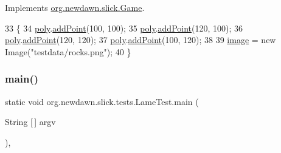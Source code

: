 Implements \mbox{\hyperlink{interfaceorg_1_1newdawn_1_1slick_1_1_game_ad2dd6affab08bb8fdb5fab0815957b7a}{org.\+newdawn.\+slick.\+Game}}.


\begin{DoxyCode}
33                                                                     \{
34         \mbox{\hyperlink{classorg_1_1newdawn_1_1slick_1_1tests_1_1_lame_test_a5d3e81e1db5ba7234621635d3665753d}{poly}}.\mbox{\hyperlink{classorg_1_1newdawn_1_1slick_1_1geom_1_1_polygon_a62d22ea48361fe38f8868f1f126a7b7a}{addPoint}}(100, 100);
35         \mbox{\hyperlink{classorg_1_1newdawn_1_1slick_1_1tests_1_1_lame_test_a5d3e81e1db5ba7234621635d3665753d}{poly}}.\mbox{\hyperlink{classorg_1_1newdawn_1_1slick_1_1geom_1_1_polygon_a62d22ea48361fe38f8868f1f126a7b7a}{addPoint}}(120, 100);
36         \mbox{\hyperlink{classorg_1_1newdawn_1_1slick_1_1tests_1_1_lame_test_a5d3e81e1db5ba7234621635d3665753d}{poly}}.\mbox{\hyperlink{classorg_1_1newdawn_1_1slick_1_1geom_1_1_polygon_a62d22ea48361fe38f8868f1f126a7b7a}{addPoint}}(120, 120);
37         \mbox{\hyperlink{classorg_1_1newdawn_1_1slick_1_1tests_1_1_lame_test_a5d3e81e1db5ba7234621635d3665753d}{poly}}.\mbox{\hyperlink{classorg_1_1newdawn_1_1slick_1_1geom_1_1_polygon_a62d22ea48361fe38f8868f1f126a7b7a}{addPoint}}(100, 120);
38     
39         \mbox{\hyperlink{classorg_1_1newdawn_1_1slick_1_1tests_1_1_lame_test_a00beddefcc3b233938def19fc8d969fb}{image}} = \textcolor{keyword}{new} Image(\textcolor{stringliteral}{"testdata/rocks.png"});
40     \}
\end{DoxyCode}
\mbox{\label{classorg_1_1newdawn_1_1slick_1_1tests_1_1_lame_test_a6d201f9fcd6ffc8dfa6bc2a49913dd2d}} 
\subsubsection{\texorpdfstring{main()}{main()}}
{\footnotesize\ttfamily static void org.\+newdawn.\+slick.\+tests.\+Lame\+Test.\+main (\begin{DoxyParamCaption}\item[{String \mbox{[}$\,$\mbox{]}}]{argv }\end{DoxyParamCaption})\hspace{0.3cm}{\ttfamily [inline]}, {\ttfamily [static]}}

